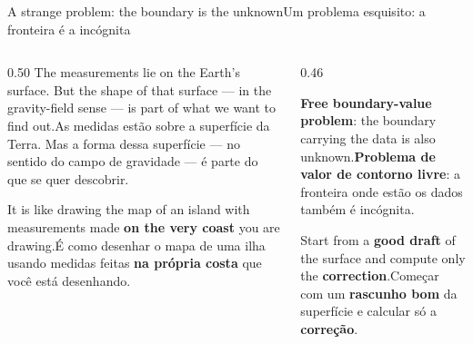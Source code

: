 \documentclass[aspectratio=169,11pt]{beamer}
\newcommand{\tr}[2]{\ifEN#2\else#1\fi}
\newcommand{\bnum}[1]{\textbf{\textcolor{mTeal}{#1}}}
\begin{document}
\begin{frame}{\tr{Um problema esquisito: a fronteira é a incógnita}{A strange problem: the
  boundary is the unknown}}
  \begin{columns}[T]
    \begin{column}{0.50\textwidth}
      \tr{As medidas estão sobre a superfície da Terra. Mas a forma dessa superfície --- no
      sentido do campo de gravidade --- é parte do que se quer descobrir.}{The measurements lie
      on the Earth's surface. But the shape of that surface --- in the gravity-field sense ---
      is part of what we want to find out.}
      \medskip

      \tr{É como desenhar o mapa de uma ilha usando medidas feitas \bnum{na própria costa} que
      você está desenhando.}{It is like drawing the map of an island with measurements made
      \bnum{on the very coast} you are drawing.}
    \end{column}
    \begin{column}{0.46\textwidth}
      \begin{ideia}[title={\tr{O nome técnico}{The technical name}}]
        \small\tr{\textbf{Problema de valor de contorno livre}: a fronteira onde estão os dados
        também é incógnita.}{\textbf{Free boundary-value problem}: the boundary carrying the
        data is also unknown.}
      \end{ideia}
      \medskip
      \begin{cuidado}[title={\tr{A saída de Molodensky}{Molodensky's way out}}]
        \small\tr{Começar com um \bnum{rascunho bom} da superfície e calcular só a
        \bnum{correção}.}{Start from a \bnum{good draft} of the surface and compute only the
        \bnum{correction}.}
      \end{cuidado}
    \end{column}
  \end{columns}
\end{frame}
\end{document}
